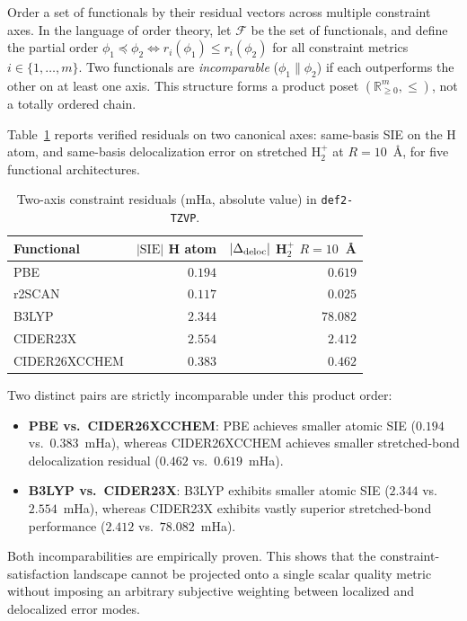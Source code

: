 \documentclass[11pt]{report}
\theoremstyle{definition}
\theoremstyle{remark}
\newcommand{\SIE}{\mathrm{SIE}}
\begin{document}
Order a set of functionals by their residual vectors across multiple
constraint axes. In the language of order theory, let $\mathcal{F}$ be the set of
functionals, and define the partial order $\phi_1 \preceq \phi_2 \iff r_i(\phi_1) \le r_i(\phi_2)$
for all constraint metrics $i \in \{1, \dots, m\}$. Two functionals are \emph{incomparable}
($\phi_1 \parallel \phi_2$) if each outperforms the other on at least one axis.
This structure forms a product poset $(\mathbb{R}_{\ge 0}^m, \le)$, not a totally ordered chain.

Table~\ref{tab:poset} reports verified residuals on two canonical axes: same-basis SIE
on the H atom, and same-basis delocalization error on stretched H$_2^+$ at
$R = 10$~\AA, for five functional architectures.

\begin{table}[htbp]
\centering
\caption{Two-axis constraint residuals (mHa, absolute value) in \texttt{def2-TZVP}.}
\label{tab:poset}
\begin{tabular}{lrr}
\toprule
Functional & $|\SIE|$ H atom & $|\Delta_{\rm deloc}|$ H$_2^+$ $R{=}10$~\AA \\
\midrule
PBE              & $0.194$ & $0.619$ \\
r2SCAN           & $0.117$ & $0.025$ \\
B3LYP            & $2.344$ & $78.082$ \\
CIDER23X         & $2.554$ & $2.412$ \\
CIDER26XCCHEM    & $0.383$ & $0.462$ \\
\bottomrule
\end{tabular}
\end{table}

Two distinct pairs are strictly incomparable under this product order:
\begin{itemize}
  \item \textbf{PBE vs.\ CIDER26XCCHEM}: PBE achieves smaller atomic SIE ($0.194$ vs.\ $0.383$~mHa),
        whereas CIDER26XCCHEM achieves smaller stretched-bond delocalization residual ($0.462$ vs.\ $0.619$~mHa).
  \item \textbf{B3LYP vs.\ CIDER23X}: B3LYP exhibits smaller atomic SIE ($2.344$ vs.\ $2.554$~mHa),
        whereas CIDER23X exhibits vastly superior stretched-bond performance ($2.412$ vs.\ $78.082$~mHa).
\end{itemize}

Both incomparabilities are empirically proven. This shows that the constraint-satisfaction
landscape cannot be projected onto a single scalar quality metric without imposing
an arbitrary subjective weighting between localized and delocalized error modes.
\end{document}
